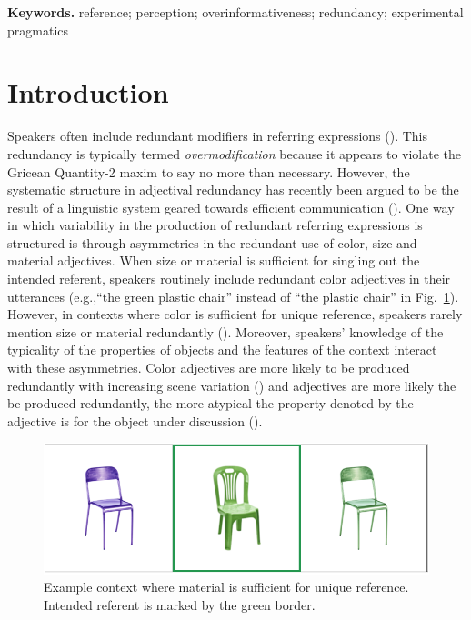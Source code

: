 \documentclass[12pt,letterpaper]{article}
\newenvironment{keywords}{%
\vspace{.5em}
\noindent\begin{minipage}{1\textwidth}
\setlength{\leftskip}{0.4in}
\setlength{\rightskip}{0.4in}
\textbf{Keywords.}}
{\end{minipage}}
\begin{document}
\begin{keywords} %
reference; perception; overinformativeness; redundancy; experimental pragmatics
\end{keywords}

\section{Introduction} 

Speakers often include redundant modifiers in referring expressions  (\citealt{Pechmann1989,GattEtAl2011,ArtsEtAl2011,KoolenEtAl2013}). This redundancy is typically termed \emph{overmodification} because it appears to violate the Gricean Quantity-2 maxim to say no more than necessary. However, the systematic structure in  adjectival redundancy has recently been argued to be the result of a linguistic system geared towards efficient communication (\citealt{DegenEtAl2020,RubioEtAl2019}). One way in which variability in the production of redundant referring expressions is structured is through asymmetries in the redundant use of color, size and material adjectives. When size or material is sufficient for singling out the intended referent, speakers routinely include redundant color adjectives in their utterances (e.g.,``the green plastic chair'' instead of ``the plastic chair'' in Fig.~\ref{fig:chairs}). However, in contexts where color is sufficient for unique reference, speakers rarely mention size or material redundantly (\citealt{Pechmann1989, Sedivy2003, GattEtAl2011, RubioFernandez2016, DegenEtAl2020}). Moreover, speakers' knowledge of the typicality of the properties of objects and the features of the context interact with these asymmetries. Color adjectives are more likely to be produced redundantly with increasing scene variation (\citealt{DegenEtAl2020, DaviesKatsos2013, KoolenEtAl2013}) and adjectives are more likely the be produced redundantly, the more atypical the property denoted by the adjective is for the object under discussion (\citealt{DegenEtAl2020, WesterbeekEtAl2015, Mitchell2013}).

\begin{figure}[ht]
   \centering
   \includegraphics[width=.7\textwidth]{img/chairs.png}
   \caption{Example context where material is sufficient for unique reference. Intended referent is marked by the green border.}
   \label{fig:chairs}
\end{figure}
\end{document}
